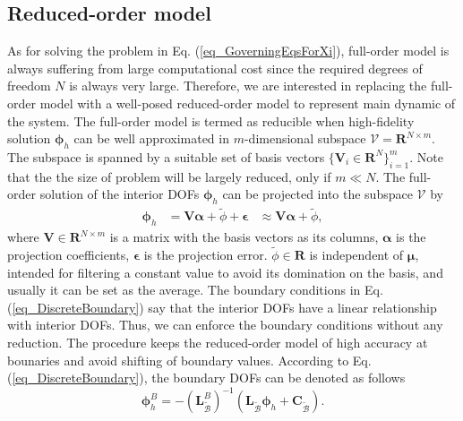 \documentclass[preprint, 10pt]{elsarticle}
\begin{document}
\subsection{Reduced-order model}
\label{sec_ROM}
As for solving the problem in Eq. (\ref{eq_GoverningEqsForXi}), full-order model is always suffering from large computational cost since the required degrees of freedom $N$ is always very large.  Therefore, we are interested in replacing the full-order model with a well-posed  reduced-order model to represent main dynamic of the system. The full-order model is termed as reducible when high-fidelity solution $\pmb{\phi} _h$ can be well approximated in $m$-dimensional subspace $\mathcal{V}=\mathbf{R}^{N \times m}$. The subspace is spanned by a suitable set of basis vectors $\{\mathbf{V}_i \in \mathbf{R}^{N} \}_{i=1}^m$.  Note that the the size of problem will be largely reduced, only if $m \ll N$. The full-order solution of the interior DOFs $\pmb{\phi} _h$ can be projected into the subspace $\mathcal{V}$ by
\begin{equation}
\begin{aligned}
\pmb{\phi} _h  &   =   \mathbf{V} \pmb{\alpha} + \tilde{\phi} + \pmb{\epsilon}
               &\approx \mathbf{V} \pmb{\alpha} + \tilde{\phi},
\end{aligned}
\label{eq_projection}
\end{equation}
where $\mathbf{V} \in \mathbf{R}^{N\times m}$ is a matrix with the basis vectors as its columns, $\pmb{\alpha}$ is   the projection coefficients, $\pmb{\epsilon}$ is the projection error. $\tilde{\phi} \in \mathbf{R}$ is independent of $\pmb{\mu}$, intended for filtering a constant value to avoid its domination on the basis, and usually it can be set as the average. The boundary conditions in Eq. (\ref{eq_DiscreteBoundary}) say that the interior DOFs have a linear relationship with interior DOFs. Thus, we can enforce the boundary conditions without any reduction. The procedure keeps the reduced-order model of high accuracy at bounaries and avoid shifting of boundary values. According to Eq.(\ref{eq_DiscreteBoundary}), the boundary DOFs can be denoted as follows
\begin{equation}
\pmb{\phi}_h^{B} = -( \mathbf{L}_{\widetilde {\mathcal{B}}}^{B} )^{-1}
\left(
\mathbf{L}_{\widetilde {\mathcal{B}}} \pmb{\phi}_h +
\mathbf{C}_{\widetilde {\mathcal{B}}}
\right).
\label{eq_DerivePhiB}
\end{equation}
\end{document}
